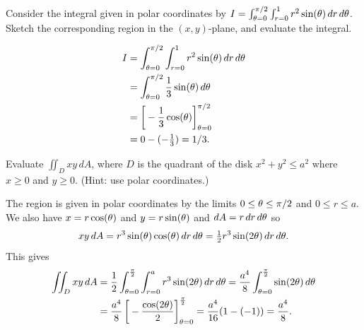 \documentclass[a4paper]{amsart}
\renewenvironment{solution}{\SolutionInline}{\endSolutionInline}
\begin{document}
\begin{exercise}
 Consider the integral given in polar coordinates by
 $I=\int_{\theta=0}^{\pi/2}\int_{r=0}^1r^2\sin(\theta)\,dr\,d\theta$. 
 Sketch the corresponding region in the $(x,y)$-plane, and evaluate
 the integral.
\end{exercise}
\begin{solution}
  \begin{minipage}[t]{11cm}
    \begin{align*}
     I &= \int_{\tht=0}^{\pi/2}\int_{r=0}^1r^2\sin(\tht)\,dr\,d\tht \\
       &= \int_{\tht=0}^{\pi/2}\frac{1}{3}\sin(\tht)\,d\tht \\
       &= \CH{-\frac{1}{3}\cos(\tht)}_{\tht=0}^{\pi/2} \\
       &= 0 - (-\tfrac{1}{3}) = 1/3.
    \end{align*}
  \end{minipage} \hfill \parbox[t]{5cm}{
  } 
\end{solution}

\begin{exercise}
 Evaluate $\displaystyle \iint_D xy\,dA$, where $D$ is the quadrant of
 the disk $x^2+y^2\leq a^2$ where $x\geq 0$ and $y\geq 0$.  (Hint: use
 polar coordinates.)
\end{exercise}
\begin{solution}
 The region is given in polar coordinates by the limits
 $0\leq\theta\leq\pi/2$ and $0\leq r\leq a$.  We also have
 $x=r\cos(\theta)$ and $y=r\sin(\theta)$ and $dA=r\,dr\,d\theta$ so 
 \[ xy\,dA = r^3\sin(\theta)\cos(\theta)\,dr\,d\theta =
     \tfrac{1}{2} r^3\sin(2\theta) \,dr\,d\theta.
 \]
 This gives
 \begin{align*}
  \iint_D xy\,dA 
   &= \frac{1}{2}\int_{\tht=0}^{\frac{\pi}{2}}\int_{r=0}^a 
       r^3 \sin(2\tht)\,dr\,d\tht
    = \frac{a^4}{8} \int_{\tht=0}^{\frac{\pi}{2}}\sin(2\tht)\,d\tht \\
   &= \frac{a^4}{8} \CH{-\frac{\cos(2\tht)}{2}}_{\tht=0}^{\frac{\pi}{2}}
    = \frac{a^4}{16}(1-(-1)) = \frac{a^4}{8}.
 \end{align*}
\end{solution}
\end{document}
